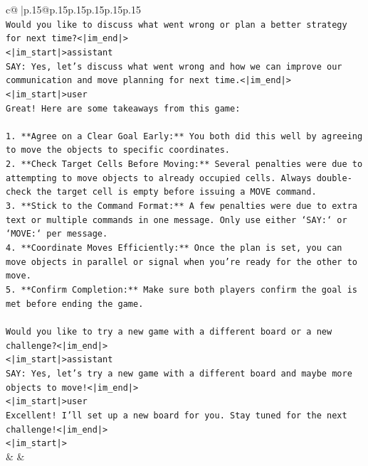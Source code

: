 \documentclass{article}
\begin{document}
{\begin{supertabular}{c@{$\;$}|p{.15\linewidth}@{}p{.15\linewidth}p{.15\linewidth}p{.15\linewidth}p{.15\linewidth}p{.15\linewidth}}
{{{\\ 
\texttt{Would you like to discuss what went wrong or plan a better strategy for next time?<|im\_end|>} \\
\texttt{<|im\_start|>assistant} \\
\texttt{SAY: Yes, let's discuss what went wrong and how we can improve our communication and move planning for next time.<|im\_end|>} \\
\texttt{<|im\_start|>user} \\
\texttt{Great! Here are some takeaways from this game:} \\
\\ 
\texttt{1. **Agree on a Clear Goal Early:** You both did this well by agreeing to move the objects to specific coordinates.} \\
\texttt{2. **Check Target Cells Before Moving:** Several penalties were due to attempting to move objects to already occupied cells. Always double{-}check the target cell is empty before issuing a MOVE command.} \\
\texttt{3. **Stick to the Command Format:** A few penalties were due to extra text or multiple commands in one message. Only use either `SAY:` or `MOVE:` per message.} \\
\texttt{4. **Coordinate Moves Efficiently:** Once the plan is set, you can move objects in parallel or signal when you're ready for the other to move.} \\
\texttt{5. **Confirm Completion:** Make sure both players confirm the goal is met before ending the game.} \\
\\ 
\texttt{Would you like to try a new game with a different board or a new challenge?<|im\_end|>} \\
\texttt{<|im\_start|>assistant} \\
\texttt{SAY: Yes, let's try a new game with a different board and maybe more objects to move!<|im\_end|>} \\
\texttt{<|im\_start|>user} \\
\texttt{Excellent! I'll set up a new board for you. Stay tuned for the next challenge!<|im\_end|>} \\
\texttt{<|im\_start|>} \\
            }
        }
    }
    & & \\ \\


\end{supertabular}}
\end{document}

